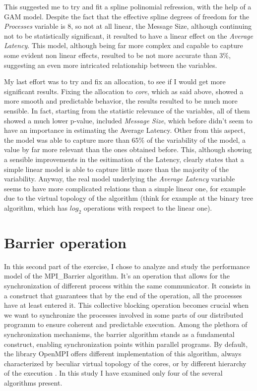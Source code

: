 \documentclass{article}
\begin{document}
	
	
	This suggested me to try and fit a spline polinomial refression, with the help of a GAM model. Despite the fact that the effective spline degrees of freedom for the \textit{Processes} variable is 8, so not at all linear, the Message Size, although continuing not to be statistically significant, it resulted to have a linear effect on the \textit{Average Latency}.
	This model, although being far more complex and capable to capture some evident non linear  effects, resulted to be not more accurate than $3\%$, suggesting an even more intricated relationship between the variables.
	
	
	
	My last effort was to try and fix an allocation, to see if I would get more significant results.
	Fixing the allocation to \textit{core}, which as said above, showed a more smooth and predictable behavior, the results resulted to be much more sensible.
	In fact, starting from the statistic relevance of the variables, all of them showed a much lower p-value, included \textit{Message Size}, which before didn't seem to have an importance in estimating the Average Latency.
	Other from this aspect, the model was able to capture more than $65\%$ of the variability of the model, a value by far more relevant than the ones obtained before. This, although showing a sensible improvements in the esitimation of the Latency, clearly states that a simple linear model is able to capture little more than the majority of the variability. Anyway, the real model underlying the \textit{Average Latency} variable seems to have more complicated relations than a simple linear one, for example due to the virtual topology of the algorithm (think for example at the binary tree algorithm, which has $log_2$ operations with respect to the linear one).
	
	
	
	
	
	\section{Barrier operation}
	
	In this second part of the exercise, I chose to analyze and study the performance model of the MPI\_Barrier algorithm. It's an operation that allows for the synchronization of different process within the same communicator. It consists in a construct that guarantees that by the end of the operation, all the processes have at least entered it.
	This collective blocking operation becomes crucial when we want to synchronize the processes involved in some parts of our distributed programm to ensure coherent and predictable execution. Among the plethora of synchronization mechanisms, the barrier algorithm stands as a fundamental construct, enabling synchronization points within parallel programs.
	By default, the library OpenMPI offers different implementation of this algorithm, always characterized by beculiar virtual topology of the cores, or by different hierarchy of the execution \cite{barrier_article}. In this study I have examined only four of the  several algorithms present.
	
\end{document}

